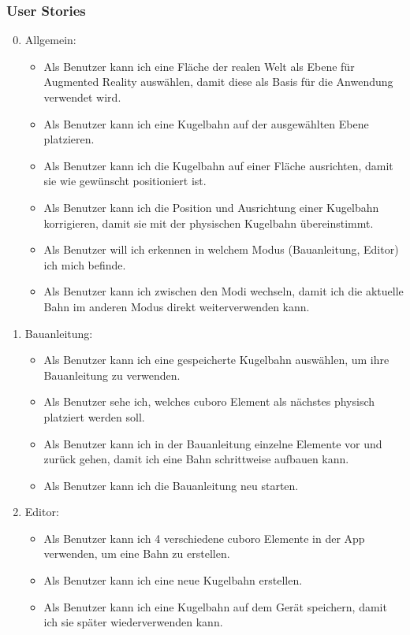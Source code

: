 \subsubsection{User Stories}
\begin{enumerate}
	\setcounter{enumi}{-1}	%
	\item Allgemein:
	\begin{itemize}
		\item Als Benutzer kann ich eine Fläche der realen Welt als Ebene für Augmented Reality auswählen, damit diese als Basis für die Anwendung verwendet wird.
		\item Als Benutzer kann ich eine Kugelbahn auf der ausgewählten Ebene platzieren.
		\item Als Benutzer kann ich die Kugelbahn auf einer Fläche ausrichten, damit sie wie gewünscht positioniert ist.
		\item Als Benutzer kann ich die Position und Ausrichtung einer Kugelbahn korrigieren, damit sie mit der physischen Kugelbahn übereinstimmt.
		\item Als Benutzer will ich erkennen in welchem Modus (Bauanleitung, Editor) ich mich befinde.
		\item Als Benutzer kann ich zwischen den Modi wechseln, damit ich die aktuelle Bahn im anderen Modus direkt weiterverwenden kann.
	\end{itemize}
	\item Bauanleitung:
	\begin{itemize}
		\item Als Benutzer kann ich eine gespeicherte Kugelbahn auswählen, um ihre Bauanleitung zu verwenden.
		\item Als Benutzer sehe ich, welches cuboro Element als nächstes physisch platziert werden soll.
		\item Als Benutzer kann ich in der Bauanleitung einzelne Elemente vor und zurück gehen, damit ich eine Bahn schrittweise aufbauen kann.
		\item Als Benutzer kann ich die Bauanleitung neu starten.
	\end{itemize}
	\item Editor:
	\begin{itemize}
		\item Als Benutzer kann ich 4 verschiedene cuboro Elemente in der App verwenden, um eine Bahn zu erstellen.
		\item Als Benutzer kann ich eine neue Kugelbahn erstellen.
		\item Als Benutzer kann ich eine Kugelbahn auf dem Gerät speichern, damit ich sie später wiederverwenden kann.

\end{itemize}
\end{enumerate}
